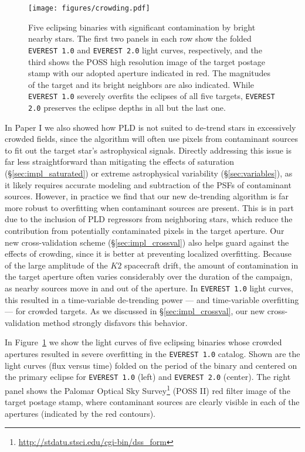 \documentclass[]{emulateapj}
\begin{document}
\begin{figure}[hbt]
  \begin{center}
      \texttt{[image: figures/crowding.pdf]}
      \vspace*{-0.5in}
       \caption{Five eclipsing binaries with significant contamination by bright nearby stars. The first
       two panels in each row show the folded \texttt{EVEREST 1.0} and \texttt{EVEREST 2.0} light curves, respectively,
       and the third shows the POSS high resolution image of
       the target postage stamp with our adopted aperture indicated in red. The magnitudes of the target
       and its bright neighbors are also indicated. While \texttt{EVEREST 1.0} severely overfits the eclipses of
       all five targets, \texttt{EVEREST 2.0} preserves the eclipse depths in all but the last one.}
     \label{fig:crowding}
  \end{center}
\end{figure}

In Paper I we also showed how PLD is not suited to de-trend stars in excessively crowded fields,
since the algorithm will often use pixels from contaminant sources to fit out the target star's astrophysical
signals. Directly addressing this issue is far less straightforward than mitigating the effects of saturation (\S\ref{sec:impl_saturated})
or extreme astrophysical variability (\S\ref{sec:variables}), as it likely requires accurate modeling and
subtraction of the PSFs of contaminant sources. However, in practice we find that our new de-trending
algorithm is far more robust to overfitting when contaminant sources are present. This is in part
due to the inclusion of PLD regressors from neighboring stars, which reduce the contribution from
potentially contaminated pixels in the target aperture. Our new cross-validation scheme (\S\ref{sec:impl_crossval})
also helps guard against the effects of crowding, since it is better at preventing localized
overfitting. Because of the large amplitude of the $K2$ spacecraft drift, the amount of contamination
in the target aperture often varies considerably over the duration of the campaign, as nearby sources
move in and out of the aperture. In \texttt{EVEREST 1.0} light curves, this resulted in a time-variable
de-trending power --- and time-variable overfitting --- for crowded targets. As we discussed in \S\ref{sec:impl_crossval},
our new cross-validation method strongly disfavors this behavior.

In Figure~\ref{fig:crowding} we show the light curves of five eclipsing binaries whose crowded apertures
resulted in severe overfitting in the \texttt{EVEREST 1.0} catalog. Shown are the light curves (flux versus time) folded
on the period of the binary and centered on the primary eclipse for \texttt{EVEREST 1.0} (left) and \texttt{EVEREST 2.0} (center).
The right panel shows the Palomar Optical Sky Survey\footnote{\url{http://stdatu.stsci.edu/cgi-bin/dss_form}} (POSS II)
red filter image of the target postage stamp, where contaminant sources are clearly visible in each of the apertures (indicated
by the red contours).
\end{document}
